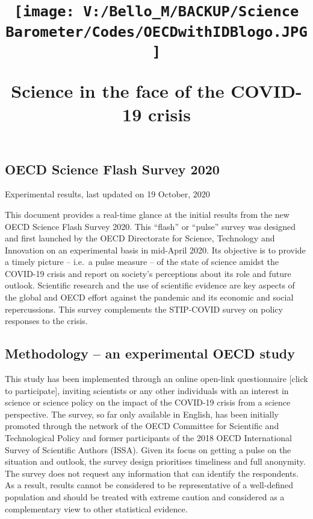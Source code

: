\documentclass[
]{article}
\title{\texttt{[image: V:/Bello\_M/BACKUP/Science Barometer/Codes/OECDwithIDBlogo.JPG]}

Science in the face of the COVID-19 crisis}
\author{}
\date{\vspace{-2.5em}}
\begin{document}
\maketitle

\hypertarget{oecd-science-flash-survey-2020}{%
\subsection{OECD Science Flash Survey
2020}\label{oecd-science-flash-survey-2020}}

Experimental results, last updated on 19 October, 2020

This document provides a real-time glance at the initial results from
the new OECD Science Flash Survey 2020. This ``flash'' or ``pulse''
survey was designed and first launched by the OECD Directorate for
Science, Technology and Innovation on an experimental basis in mid-April
2020. Its objective is to provide a timely picture -- i.e.~a pulse
measure -- of the state of science amidst the COVID-19 crisis and report
on society's perceptions about its role and future outlook. Scientific
research and the use of scientific evidence are key aspects of the
global and OECD effort against the pandemic and its economic and social
repercussions. This survey complements the STIP-COVID survey on policy
responses to the crisis.

\hypertarget{methodology-an-experimental-oecd-study}{%
\subsection{\texorpdfstring{\textbf{Methodology -- an experimental OECD
study}}{Methodology -- an experimental OECD study}}\label{methodology-an-experimental-oecd-study}}

This study has been implemented through an online open-link
questionnaire {[}click to participate{]}, inviting scientists or any
other individuals with an interest in science or science policy on the
impact of the COVID-19 crisis from a science perspective. The survey, so
far only available in English, has been initially promoted through the
network of the OECD Committee for Scientific and Technological Policy
and former participants of the 2018 OECD International Survey of
Scientific Authors (ISSA). Given its focus on getting a pulse on the
situation and outlook, the survey design prioritises timeliness and full
anonymity. The survey does not request any information that can identify
the respondents. As a result, results cannot be considered to be
representative of a well-defined population and should be treated with
extreme caution and considered as a complementary view to other
statistical evidence.
\end{document}
